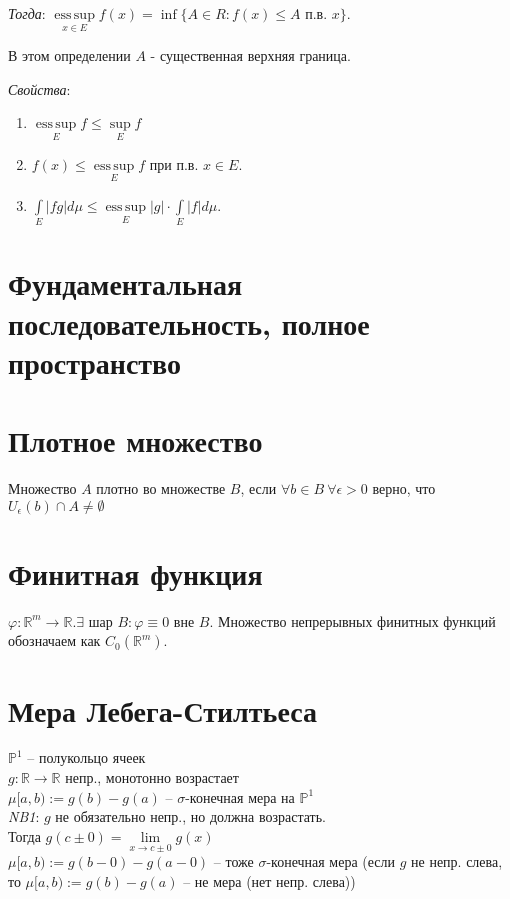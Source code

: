 \documentclass[paper=a4, fontsize=17pt]{article}
\DeclareMathOperator*{\esssup}{ess\, sup}
\begin{document}
	\emph{Тогда}: $\esssup\limits_{x \in E} f(x) = \inf \{A \in R : f(x) \leq A$ п.в. $x \}$. 
	
	В этом определении $A$ - существенная верхняя граница. 
	
	\emph{Свойства}:
	\begin{enumerate}
		\item
		$\esssup\limits_E f \leq \sup\limits_E f$
		
		\item
		$f(x) \leq \esssup\limits_E f$ при п.в. $x \in E$.
		
		\item
		$\int\limits_E |fg|d\mu \leq \esssup\limits_E |g| \cdot \int\limits_E |f|d\mu$.
	\end{enumerate}
	
	\section{Фундаментальная последовательность, полное пространство}
	
	\section{Плотное множество}
	Множество $A$ плотно во множестве $B$, если $\forall b \in B \  \forall \epsilon > 0$ верно, что $U_\epsilon(b) \cap A \neq \emptyset$
 
	\section{Финитная функция}
	$\varphi : \mathbb{R}^m \rightarrow \mathbb{R}. \exists $ шар $B: \varphi \equiv 0 $ вне $B$. Множество непрерывных финитных функций обозначаем как $C_0(\mathbb{R}^m)$. 
	
	\section{Мера Лебега-Стилтьеса}
	$\mathbb{P}^1$ -- полукольцо ячеек \\
	$g : \mathbb{R} \rightarrow \mathbb{R}$ непр., монотонно возрастает \\
	$\mu [a, b):=g(b) - g(a)$ -- $\sigma$-конечная мера на $\mathbb{P}^1$ \\
	
	\emph{NB1}: $g$ не обязательно непр., но должна возрастать. \\
	Тогда $g(c \pm 0)=\lim\limits_{x \rightarrow c \pm 0} g(x)$ \\ 
	$\mu [a, b):=g(b - 0) - g(a - 0)$ -- тоже $\sigma$-конечная мера (если $g$ не непр. слева, то $\mu [a, b):=g(b) - g(a)$ -- не мера (нет непр. слева)) \\
	
\end{document}
